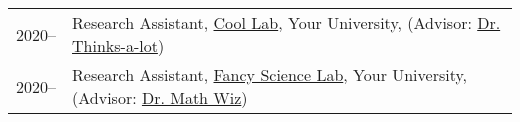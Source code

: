 
\begin{longtable}[l]{@{}p{} p{}}

    2020-- & Research Assistant, \href{https://example.com/}{Cool Lab}, Your University, (Advisor: \href{https://example.com/}{Dr. Thinks-a-lot}) \\

    2020-- & Research Assistant, \href{https://example.com/}{Fancy Science Lab}, Your University, (Advisor: \href{https://example.com/}{Dr. Math Wiz}) \\

\end{longtable}